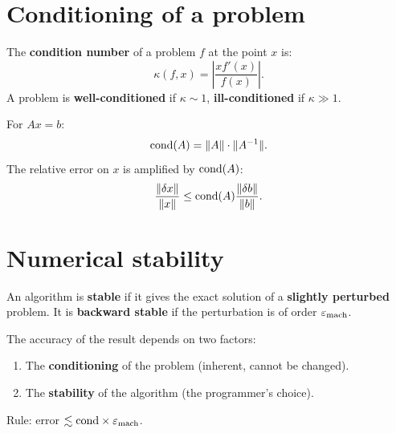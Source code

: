 \section{Conditioning of a problem}

\begin{definition}
The \textbf{condition number} of a problem $f$ at the point $x$ is:
\[
\kappa(f,x) = \left|\frac{xf'(x)}{f(x)}\right|.
\]
A problem is \textbf{well-conditioned} if $\kappa\sim 1$, \textbf{ill-conditioned} if $\kappa\gg 1$.
\end{definition}

\begin{definition}
For $Ax=b$:
\[
\mathrm{cond}(A) = \|A\|\cdot\|A^{-1}\|.
\]
The relative error on $x$ is amplified by $\mathrm{cond}(A)$:
\[
\frac{\|\delta x\|}{\|x\|} \leq \mathrm{cond}(A)\frac{\|\delta b\|}{\|b\|}.
\]
\end{definition}

\section{Numerical stability}

\begin{definition}
An algorithm is \textbf{stable} if it gives the exact solution of a \textbf{slightly perturbed} problem. It is \textbf{backward stable} if the perturbation is of order $\varepsilon_{\mathrm{mach}}$.
\end{definition}

\begin{method}
The accuracy of the result depends on two factors:
\begin{enumerate}
\item The \textbf{conditioning} of the problem (inherent, cannot be changed).
\item The \textbf{stability} of the algorithm (the programmer's choice).
\end{enumerate}
Rule: error $\lesssim \mathrm{cond} \times \varepsilon_{\mathrm{mach}}$.
\end{method}

\begin{center}
\end{center}

